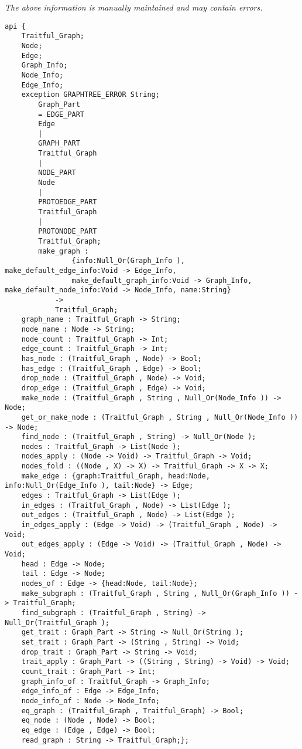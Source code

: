 \label{api:Dot\_Graphtree}

{\tiny \it The above information is manually maintained and may contain errors.}
\begin{verbatim}
api {
    Traitful_Graph;
    Node;
    Edge;
    Graph_Info;
    Node_Info;
    Edge_Info;
    exception GRAPHTREE_ERROR String;
        Graph_Part
        = EDGE_PART
        Edge
        |
        GRAPH_PART
        Traitful_Graph
        |
        NODE_PART
        Node
        |
        PROTOEDGE_PART
        Traitful_Graph
        |
        PROTONODE_PART
        Traitful_Graph;
        make_graph :
                {info:Null_Or(Graph_Info ), make_default_edge_info:Void -> Edge_Info,
                make_default_graph_info:Void -> Graph_Info, make_default_node_info:Void -> Node_Info, name:String}
            ->
            Traitful_Graph;
    graph_name : Traitful_Graph -> String;
    node_name : Node -> String;
    node_count : Traitful_Graph -> Int;
    edge_count : Traitful_Graph -> Int;
    has_node : (Traitful_Graph , Node) -> Bool;
    has_edge : (Traitful_Graph , Edge) -> Bool;
    drop_node : (Traitful_Graph , Node) -> Void;
    drop_edge : (Traitful_Graph , Edge) -> Void;
    make_node : (Traitful_Graph , String , Null_Or(Node_Info )) -> Node;
    get_or_make_node : (Traitful_Graph , String , Null_Or(Node_Info )) -> Node;
    find_node : (Traitful_Graph , String) -> Null_Or(Node );
    nodes : Traitful_Graph -> List(Node );
    nodes_apply : (Node -> Void) -> Traitful_Graph -> Void;
    nodes_fold : ((Node , X) -> X) -> Traitful_Graph -> X -> X;
    make_edge : {graph:Traitful_Graph, head:Node, info:Null_Or(Edge_Info ), tail:Node} -> Edge;
    edges : Traitful_Graph -> List(Edge );
    in_edges : (Traitful_Graph , Node) -> List(Edge );
    out_edges : (Traitful_Graph , Node) -> List(Edge );
    in_edges_apply : (Edge -> Void) -> (Traitful_Graph , Node) -> Void;
    out_edges_apply : (Edge -> Void) -> (Traitful_Graph , Node) -> Void;
    head : Edge -> Node;
    tail : Edge -> Node;
    nodes_of : Edge -> {head:Node, tail:Node};
    make_subgraph : (Traitful_Graph , String , Null_Or(Graph_Info )) -> Traitful_Graph;
    find_subgraph : (Traitful_Graph , String) -> Null_Or(Traitful_Graph );
    get_trait : Graph_Part -> String -> Null_Or(String );
    set_trait : Graph_Part -> (String , String) -> Void;
    drop_trait : Graph_Part -> String -> Void;
    trait_apply : Graph_Part -> ((String , String) -> Void) -> Void;
    count_trait : Graph_Part -> Int;
    graph_info_of : Traitful_Graph -> Graph_Info;
    edge_info_of : Edge -> Edge_Info;
    node_info_of : Node -> Node_Info;
    eq_graph : (Traitful_Graph , Traitful_Graph) -> Bool;
    eq_node : (Node , Node) -> Bool;
    eq_edge : (Edge , Edge) -> Bool;
    read_graph : String -> Traitful_Graph;};
\end{verbatim}
